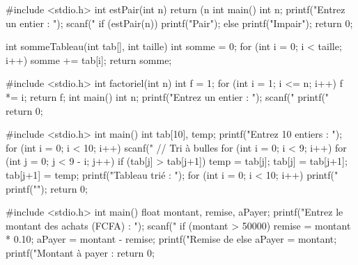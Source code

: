 \begin{ccode}
#include <stdio.h>
int estPair(int n) {
    return (n %
}
int main() {
    int n;
    printf("Entrez un entier : ");
    scanf("%
    if (estPair(n)) {
        printf("Pair\n");
    } else {
        printf("Impair\n");
    }
    return 0;
}
\end{ccode}

\begin{ccode}
int sommeTableau(int tab[], int taille) {
    int somme = 0;
    for (int i = 0; i < taille; i++) {
        somme += tab[i];
    }
    return somme;
}
\end{ccode}

\begin{ccode}
#include <stdio.h>
int factoriel(int n) {
    int f = 1;
    for (int i = 1; i <= n; i++) {
        f *= i;
    }
    return f;
}
int main() {
    int n;
    printf("Entrez un entier : ");
    scanf("%
    printf("%
    return 0;
}
\end{ccode}


\begin{ccode}
#include <stdio.h>
int main() {
    int tab[10], temp;
    printf("Entrez 10 entiers : ");
    for (int i = 0; i < 10; i++) {
        scanf("%
    }
    // Tri à bulles
    for (int i = 0; i < 9; i++) {
        for (int j = 0; j < 9 - i; j++) {
            if (tab[j] > tab[j+1]) {
                temp = tab[j];
                tab[j] = tab[j+1];
                tab[j+1] = temp;
            }
        }
    }
    printf("Tableau trié : ");
    for (int i = 0; i < 10; i++) {
        printf("%
    }
    printf("\n");
    return 0;
}
\end{ccode}

\begin{ccode}
#include <stdio.h>
int main() {
    float montant, remise, aPayer;
    printf("Entrez le montant des achats (FCFA) : ");
    scanf("%
    if (montant > 50000) {
        remise = montant * 0.10;
        aPayer = montant - remise;
        printf("Remise de %
    } else {
        aPayer = montant;
    }
    printf("Montant à payer : %
    return 0;
}
\end{ccode}